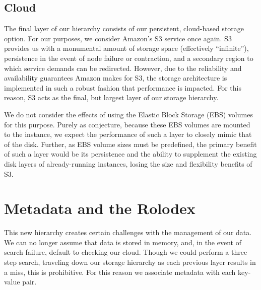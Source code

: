 \subsection{Cloud} %
\label{sub:storage_cloud}
The final layer of our hierarchy consists of our persistent, cloud-based
storage option. For our purposes, we consider Amazon's S3 service once again.
S3 provides us with a monumental amount of storage space (effectively
``infinite''), persistence in the event of node failure or contraction, and a
secondary region to which service demands can be redirected. However, due to
the reliability and availability guarantees Amazon makes for S3, the storage
architecture is implemented in such a robust fashion that performance is
impacted. For this reason, S3 acts as the final, but largest layer of our
storage hierarchy.

We do not consider the effects of using the Elastic Block Storage (EBS) volumes
for this purpose. Purely as conjecture, because these EBS volumes are mounted
to the instance, we expect the performance of such a layer to closely mimic
that of the disk. Further, as EBS volume sizes must be predefined, the primary
benefit of such a layer would be its persistence and the ability to supplement
the existing disk layers of already-running instances, losing the size and
flexibility benefits of S3.


\section{Metadata and the Rolodex} %
\label{sec:rolodex}
This new hierarchy creates certain challenges with the management of our data.
We can no longer assume that data is stored in memory, and, in the event of
search failure, default to checking our cloud. Though we could perform a three
step search, traveling down our storage hierarchy as each previous layer
results in a miss, this is prohibitive. For this reason we associate metadata
with each key-value pair.

